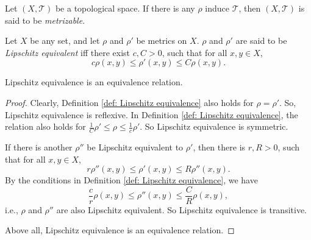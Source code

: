 \begin{definition}
	\label{def: metrizable spaces}
	Let $(X, \mathcal T)$ be a topological space. If there is any $\rho$ induce $\mathcal T$, then $(X, \mathcal T)$ is said to be \textit{metrizable}.
\end{definition}


\begin{definition}
	\label{def: Lipschitz equivalence}
	Let $X$ be any set, and let $\rho$ and $\rho'$ be metrics on $X$. $\rho$ and $\rho'$ are said to be \textit{Lipschitz equivalent} iff there exist $c, C > 0$, such that for all $x,y \in X$,
	$$
	c \rho(x,y) \le \rho'(x,y) \le C \rho(x,y).
	$$
\end{definition}


\begin{proposition}
	\label{prop: Lipschitz equivalence is a equivalence relation}
	Lipschitz equivalence is an equivalence relation.
	
	\begin{proof}
		Clearly, Definition \ref{def: Lipschitz equivalence} also holds for $\rho = \rho'$. So, Lipschitz equivalence is reflexive. In Definition \ref{def: Lipschitz equivalence}, the relation also holds for $\frac{1}{C} \rho' \le \rho \le \frac{1}{c} \rho'$. So Lipschitz equivalence is symmetric.
		
		If there is another $\rho''$ be Lipschitz equivalent to $\rho'$, then there is $r, R > 0$, such that for all $x,y \in X$,
		$$
		r\rho''(x,y) \le \rho'(x,y) \le R\rho''(x,y).
		$$
		By the conditions in Definition \ref{def: Lipschitz equivalence}, we have
		$$
		\frac{c}{r} \rho(x,y) \le \rho''(x,y) \le  \frac{C}{R} \rho(x,y),
		$$
		i.e., $\rho$ and $\rho''$ are also Lipschitz equivalent. So Lipschitz equivalence is transitive.
		
		Above all, Lipschitz equivalence is an equivalence relation.
	\end{proof}
\end{proposition}


